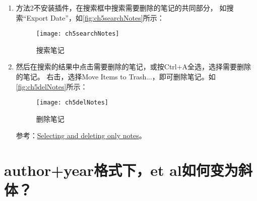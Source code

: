 \documentclass[theorem=false,mathfont=none,openany,sub3section]{easybook}
\begin{document}
{\begin{enumerate}
	\item 方法2不安装插件，在搜索框中搜索需要删除的笔记的共同部分，
	如搜索“Export Date”，如\autoref{fig:ch5searchNotes}所示：
	
	\begin{figure}[htbp]
		\centering
		\texttt{[image: ch5searchNotes]}
		\caption{搜索笔记}
		\label{fig:ch5searchNotes}
	\end{figure}
	\item 然后在搜索的结果中点击需要删除的笔记，或按Ctrl+A全选，选择需要删除的笔记。
	右击，选择Move Items to Trash...，即可删除笔记。如\autoref{fig:ch5delNotes}所示：
	
	\begin{figure}[htbp]
		\centering
		\texttt{[image: ch5delNotes]}
		\caption{删除笔记}
		\label{fig:ch5delNotes}
	\end{figure}
	
	参考：\href{https://forums.zotero.org/discussion/comment/390716#Comment_390716}{Selecting and deleting only notes}。
\end{enumerate}

\section{author+year格式下，et al如何变为斜体？}\label{sec:etal_italic}

}
\end{document}
